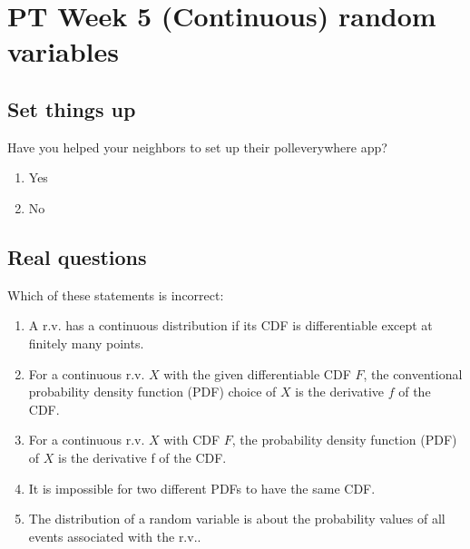 \documentclass[poll_tutorial_format]{subfiles}
\begin{document}
	\maketitle
	
	\setcounter{section}{4}
	\section{PT Week 5 (Continuous) random variables}
	
	\subsection{Set things up}
	\label{sec:set-things-up}
	
	
	
	\setcounter{theorem}{-1}
	\begin{exercise}
		Have you helped your neighbors to set up their polleverywhere app? 
		\begin{enumerate}
			\item Yes
			\item No
		\end{enumerate}
	\end{exercise}
	
	\subsection{Real questions}
	\label{sec:start-real-questions pt week 5}
	
		
	
 
	
	
	\begin{exercise}
		Which of these statements is incorrect: 
		\begin{enumerate}
			\item A r.v. has a continuous distribution if its CDF is differentiable except at finitely many points. 
			\item For a continuous r.v. $X$ with the given differentiable CDF $F$, the conventional probability density function (PDF) choice of $X$ is the 				derivative $f$ of the CDF.  
			\item For a continuous r.v. $X$ with CDF
			$F$, the probability density function (PDF) of $X$ is the derivative f of the CDF.
			\item It is impossible for two different PDFs to have the same CDF.
			\item The distribution of a random variable is about the probability values of all events associated with the r.v..
		\end{enumerate}
	\end{exercise}
	
\end{document}
